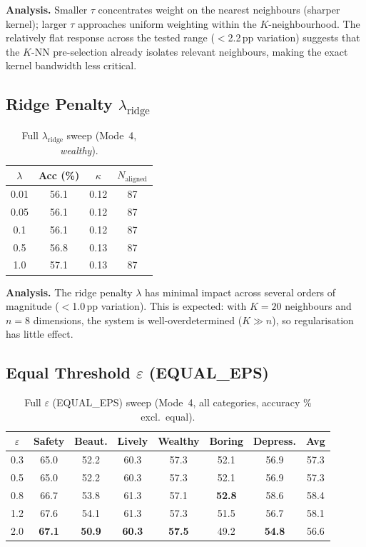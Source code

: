 \documentclass[runningheads]{llncs}
\begin{document}
\noindent\textbf{Analysis.}
Smaller $\tau$ concentrates weight on the nearest neighbours (sharper kernel); larger $\tau$ approaches uniform weighting within the $K$-neighbourhood.
The relatively flat response across the tested range ($<$2.2\,pp variation) suggests that the $K$-NN pre-selection already isolates relevant neighbours, making the exact kernel bandwidth less critical.

\subsection{Ridge Penalty $\lambda_{\mathrm{ridge}}$}

\begin{table}[H]
\centering
\caption{Full $\lambda_{\mathrm{ridge}}$ sweep (Mode~4, \emph{wealthy}).}
\label{tab:lambda_sweep}
\small
\begin{tabular}{cccc}
\toprule
$\lambda$ & Acc (\%) & $\kappa$ & $N_{\mathrm{aligned}}$ \\
\midrule
0.01 & 56.1 & 0.12 & 87 \\
0.05 & 56.1 & 0.12 & 87 \\
0.1  & 56.1 & 0.12 & 87 \\
0.5  & 56.8 & 0.13 & 87 \\
1.0  & 57.1 & 0.13 & 87 \\
\bottomrule
\end{tabular}
\end{table}

\noindent\textbf{Analysis.}
The ridge penalty $\lambda$ has minimal impact across several orders of magnitude ($<$1.0\,pp variation).
This is expected: with $K{=}20$ neighbours and $n{=}8$ dimensions, the system is well-overdetermined ($K \gg n$), so regularisation has little effect.

\subsection{Equal Threshold $\varepsilon$ (EQUAL\_EPS)}

\begin{table}[H]
\centering
\caption{Full $\varepsilon$ (EQUAL\_EPS) sweep (Mode~4, all categories, accuracy \% excl.\ equal).}
\label{tab:eps_sweep}
\small
\setlength{\tabcolsep}{4pt}
\begin{tabular}{ccccccc|c}
\toprule
$\varepsilon$ & Safety & Beaut. & Lively & Wealthy & Boring & Depress. & Avg \\
\midrule
0.3 & 65.0 & 52.2 & 60.3 & 57.3 & 52.1 & 56.9 & 57.3 \\
0.5 & 65.0 & 52.2 & 60.3 & 57.3 & 52.1 & 56.9 & 57.3 \\
0.8 & 66.7 & 53.8 & 61.3 & 57.1 & \textbf{52.8} & 58.6 & 58.4 \\
1.2 & 67.6 & 54.1 & 61.3 & 57.3 & 51.5 & 56.7 & 58.1 \\
2.0 & \textbf{67.1} & \textbf{50.9} & \textbf{60.3} & \textbf{57.5} & 49.2 & \textbf{54.8} & 56.6 \\
\bottomrule
\end{tabular}
\end{table}
\end{document}
